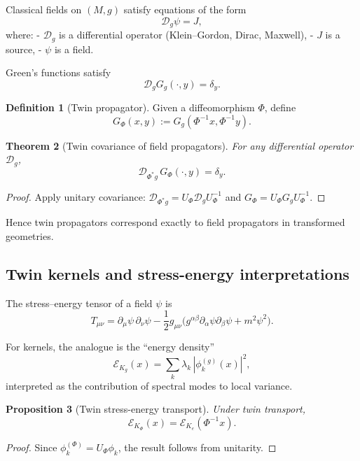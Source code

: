 \documentclass[11pt]{article}
\newtheorem{theorem}{Theorem}[section]
\newtheorem{proposition}[theorem]{Proposition}
\theoremstyle{definition}
\newtheorem{definition}[theorem]{Definition}
\begin{document}
Classical fields on $(M,g)$ satisfy equations of the form
\[
\mathcal{D}_g \psi = J,
\]
where:
- $\mathcal{D}_g$ is a differential operator (Klein–Gordon, Dirac, Maxwell),
- $J$ is a source,
- $\psi$ is a field.

Green’s functions satisfy
\[
\mathcal{D}_g G_g(\cdot,y) = \delta_y.
\]

\begin{definition}[Twin propagator]
	Given a diffeomorphism $\Phi$, define
	\[
	G_\Phi(x,y) := G_g(\Phi^{-1}x,\Phi^{-1}y).
	\]
\end{definition}

\begin{theorem}[Twin covariance of field propagators]
	For any differential operator $\mathcal{D}_g$,
	\[
	\mathcal{D}_{\Phi^\ast g}\, G_\Phi(\cdot,y)
	= \delta_y.
	\]
\end{theorem}

\begin{proof}
	Apply unitary covariance:  
	$\mathcal{D}_{\Phi^\ast g} = U_\Phi \mathcal{D}_g U_\Phi^{-1}$ and 
	$G_\Phi = U_\Phi G_g U_\Phi^{-1}$.
\end{proof}

Hence twin propagators correspond exactly to field propagators in transformed geometries.

\subsection{Twin kernels and stress-energy interpretations}

The stress–energy tensor of a field $\psi$ is
\[
T_{\mu\nu} = 
\partial_\mu\psi\,\partial_\nu\psi
- \frac12 g_{\mu\nu}\big( g^{\alpha\beta}\partial_\alpha\psi\partial_\beta\psi + m^2 \psi^2 \big).
\]

For kernels, the analogue is the “energy density”
\[
\mathcal{E}_{K_g}(x) 
= \sum_{k} \lambda_k\,|\phi_k^{(g)}(x)|^2,
\]
interpreted as the contribution of spectral modes to local variance.

\begin{proposition}[Twin stress-energy transport]
	Under twin transport,
	\[
	\mathcal{E}_{K_{\Phi}}(x)
	= \mathcal{E}_{K_e}(\Phi^{-1}x).
	\]
\end{proposition}

\begin{proof}
	Since $\phi_k^{(\Phi)} = U_\Phi \phi_k$, the result follows from unitarity.
\end{proof}
\end{document}
